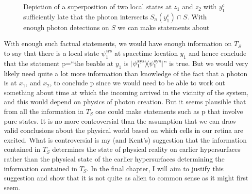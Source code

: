 \begin{figure}[ht!]
\begin{tikzpicture}


\end{tikzpicture}%

\vspace*{2px}
\caption{Depiction of a superposition of two local states at $z_1$ and $z_2$ with $y^c_1$ sufficiently late that the photon intersects $S_n(y^c_1)\cap S$. With enough photon detections on $S$ we can make statements about }
\label{kentdecoh5}
\end{figure}


 With enough such factual statements, we would have enough information on $T_S$ to say that there is a local state $\psi_1^\text{sys}$ at spacetime location $y_1$ and hence conclude that the statement p=``the beable at $y_1$ is $\dyad{\psi_1^\text{sys}}$'' is true. But we would very likely need quite a lot more information than knowledge of the fact that a photon is at $x_1$, and $x_2$, to conclude p since we would need to be able to work out something about time at which the incoming arrived in the vicinity of the system, and this would depend on physics of photon creation. But it seems plausible that from all the information in $T_S$ one could make statements such as p that involve pure states. It is no more controversial than the assumption that we can draw valid conclusions about the physical world based on which cells in our retina are excited. What is controversial is my (and Kent's) suggestion   that the information contained in $T_S$ determines the state of physical reality on earlier hypersurfaces rather than the physical state of the earlier hypersurfaces determining the information contained in $T_S$. In the final chapter, I will aim to justify this suggestion and show that it is not quite as alien to common sense as it might first seem. 
 
